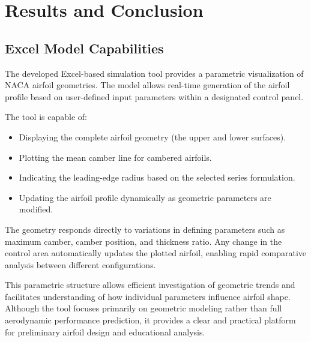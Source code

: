 
\section*{Results and Conclusion}


\subsection*{Excel Model Capabilities}

The developed Excel-based simulation tool provides a parametric visualization of NACA airfoil geometries. 
The model allows real-time generation of the airfoil profile based on user-defined input parameters within a designated control panel.

The tool is capable of:
\begin{itemize}
\item Displaying the complete airfoil geometry (the upper and lower surfaces).
\item Plotting the mean camber line for cambered airfoils.
\item Indicating the leading-edge radius based on the selected series formulation.
\item Updating the airfoil profile dynamically as geometric parameters are modified.
\end{itemize}

The geometry responds directly to variations in defining parameters 
such as maximum camber, camber position, and thickness ratio. 
Any change in the control area automatically updates the plotted airfoil, 
enabling rapid comparative analysis between different configurations.

This parametric structure allows efficient investigation of geometric trends and facilitates understanding of how individual parameters influence airfoil shape. 
Although the tool focuses primarily on geometric modeling rather than full aerodynamic performance prediction, 
it provides a clear and practical platform for preliminary airfoil design and educational analysis.


